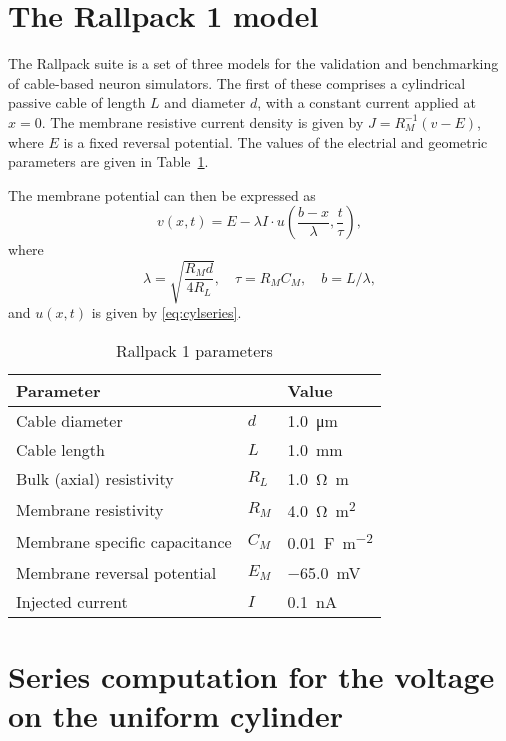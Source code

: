 \documentclass[parskip=half]{scrartcl}
\theoremstyle{nonumberplain}
\begin{document}
\newpage
\appendix
\section{The Rallpack 1 model}
\label{ap:rallpack}

The Rallpack suite \autocite{bhalla1992} is a set of three models for the
validation and benchmarking of cable-based neuron simulators. The first of
these comprises a cylindrical passive cable of length $L$ and diameter $d$,
with a constant current applied at $x=0$. The membrane resistive current
density is given by $J = R_M^{-1}(v-E)$, where $E$ is a fixed reversal potential.
The values of the electrial and geometric parameters are given in
Table~\ref{tbl:rallpack1}.

The membrane potential can then be expressed as
\begin{equation}
    v(x, t) = E - \lambda I \cdot u(\frac{b-x}{\lambda}, \frac{t}{\tau}),
\end{equation}
where
\begin{equation}
    \lambda = \sqrt{\frac{R_M d}{4 R_L}},\quad
    \tau = R_M C_M,\quad
    b = L/\lambda,
\end{equation}
and $u(x,t)$ is given by \eqref{eq:cylseries}.

\begin{table}[htb]
    \centering
    \begin{tabular}{lll}
        \toprule
	Parameter & {} & {Value} \\
        \midrule
	Cable diameter                    & $d$    & \SI{1.0}{\um} \\
	Cable length                      & $L$    & \SI{1.0}{\mm} \\
	Bulk (axial) resistivity          & $R_L$  & \SI{1.0}{\ohm\m} \\
	Membrane resistivity              & $R_M$  & \SI{4.0}{\ohm\m\squared} \\
	Membrane specific capacitance     & $C_M$  & \SI{0.01}{\F\per\m\squared} \\
	Membrane reversal potential       & $E_M$  & \SI{-65.0}{\mV} \\
	Injected current                  & $I$    & \SI{0.1}{\nA} \\
        \bottomrule
    \end{tabular}
    \caption{Rallpack 1 parameters}
    \label{tbl:rallpack1}
\end{table}


\section{Series computation for the voltage on the uniform cylinder}
\label{ap:cylcomp}
\end{document}
